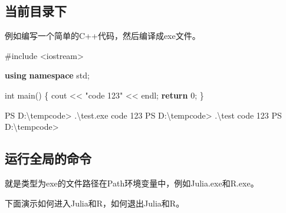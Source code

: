 \documentclass[11pt]{ctexart}
\newenvironment{Shaded}{}{}
\newcommand{\KeywordTok}[1]{\textcolor[rgb]{0.00,0.44,0.13}{\textbf{{#1}}}}
\newcommand{\DataTypeTok}[1]{\textcolor[rgb]{0.56,0.13,0.00}{{#1}}}
\newcommand{\DecValTok}[1]{\textcolor[rgb]{0.25,0.63,0.44}{{#1}}}
\newcommand{\StringTok}[1]{\textcolor[rgb]{0.25,0.44,0.63}{{#1}}}
\newcommand{\FunctionTok}[1]{\textcolor[rgb]{0.02,0.16,0.49}{{#1}}}
\newcommand{\NormalTok}[1]{{#1}}
\newcommand{\ImportTok}[1]{{#1}}
\newcommand{\ControlFlowTok}[1]{\textcolor[rgb]{0.00,0.44,0.13}{\textbf{{#1}}}}
\newcommand{\PreprocessorTok}[1]{\textcolor[rgb]{0.74,0.48,0.00}{{#1}}}
\begin{document}
    \hypertarget{ux5f53ux524dux76eeux5f55ux4e0b}{%
\subsection{当前目录下}\label{ux5f53ux524dux76eeux5f55ux4e0b}}

例如编写一个简单的C++代码，然后编译成exe文件。

\begin{Shaded}
\begin{Highlighting}[]
\PreprocessorTok{#include }\ImportTok{<iostream>}

\KeywordTok{using} \KeywordTok{namespace}\NormalTok{ std;}

\DataTypeTok{int}\NormalTok{ main()}
\NormalTok{\{}
\NormalTok{cout << }\StringTok{"code 123"}\NormalTok{ << endl;}
\ControlFlowTok{return} \DecValTok{0}\NormalTok{;}
\NormalTok{\}}
\end{Highlighting}
\end{Shaded}

\begin{Shaded}
\begin{Highlighting}[]
\FunctionTok{PS}\NormalTok{ D:\textbackslash{}tempcode>  .\textbackslash{}test.}\FunctionTok{exe}
\NormalTok{code 123}
\FunctionTok{PS}\NormalTok{ D:\textbackslash{}tempcode> .\textbackslash{}test}
\NormalTok{code 123}
\FunctionTok{PS}\NormalTok{ D:\textbackslash{}tempcode>}
\end{Highlighting}
\end{Shaded}

    \hypertarget{ux8fd0ux884cux5168ux5c40ux7684ux547dux4ee4}{%
\subsection{运行全局的命令}\label{ux8fd0ux884cux5168ux5c40ux7684ux547dux4ee4}}

就是类型为exe的文件路径在Path环境变量中，例如Julia.exe和R.exe。

下面演示如何进入Julia和R，如何退出Julia和R。
\end{document}
